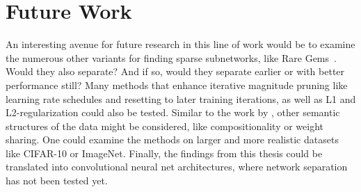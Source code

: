 \section{Future Work}
An interesting avenue for future research in this line of work would be to examine the numerous other variants for finding sparse subnetworks, like Rare Gems~\autocite{RareGems}.
Would they also separate? And if so, would they separate earlier or with better performance still?
Many methods that enhance iterative magnitude pruning like learning rate schedules and resetting to later training iterations, as well as L1 and L2-regularization could also be tested.
Similar to the work by \textcite{BIMT}, other semantic structures of the data might be considered, like compositionality or weight sharing.
One could examine the methods on larger and more realistic datasets like CIFAR-10 or ImageNet.
Finally, the findings from this thesis could be translated into convolutional neural net architectures, where network separation has not been tested yet.